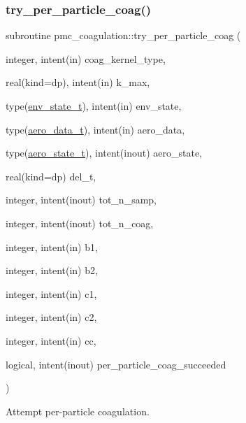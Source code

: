 \subsubsection{\texorpdfstring{try\+\_\+per\+\_\+particle\+\_\+coag()}{try\_per\_particle\_coag()}}
{\footnotesize\ttfamily subroutine pmc\+\_\+coagulation\+::try\+\_\+per\+\_\+particle\+\_\+coag (\begin{DoxyParamCaption}\item[{integer, intent(in)}]{coag\+\_\+kernel\+\_\+type,  }\item[{real(kind=dp), intent(in)}]{k\+\_\+max,  }\item[{type(\mbox{\hyperlink{structpmc__env__state_1_1env__state__t}{env\+\_\+state\+\_\+t}}), intent(in)}]{env\+\_\+state,  }\item[{type(\mbox{\hyperlink{structpmc__aero__data_1_1aero__data__t}{aero\+\_\+data\+\_\+t}}), intent(in)}]{aero\+\_\+data,  }\item[{type(\mbox{\hyperlink{structpmc__aero__state_1_1aero__state__t}{aero\+\_\+state\+\_\+t}}), intent(inout)}]{aero\+\_\+state,  }\item[{real(kind=dp)}]{del\+\_\+t,  }\item[{integer, intent(inout)}]{tot\+\_\+n\+\_\+samp,  }\item[{integer, intent(inout)}]{tot\+\_\+n\+\_\+coag,  }\item[{integer, intent(in)}]{b1,  }\item[{integer, intent(in)}]{b2,  }\item[{integer, intent(in)}]{c1,  }\item[{integer, intent(in)}]{c2,  }\item[{integer, intent(in)}]{cc,  }\item[{logical, intent(inout)}]{per\+\_\+particle\+\_\+coag\+\_\+succeeded }\end{DoxyParamCaption})}



Attempt per-\/particle coagulation. 


